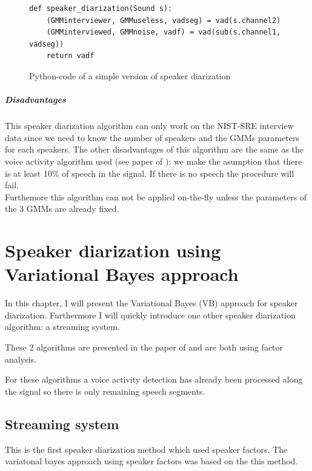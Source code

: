 \documentclass{techrep} %
\begin{document}
\begin{figure}[H]
  \begin{lstlisting}[frame=single]
    def speaker_diarization(Sound s):
    (GMMinterviewer, GMMuseless, vadseg) = vad(s.channel2)
    (GMMinterviewed, GMMnoise, vadf) = vad(sub(s.channel1, vadseg))
    return vadf
  \end{lstlisting}
  \caption{Python-code of a simple version of speaker diarization}
  \label{pseudocodenaive}
\end{figure}

\paragraph{Disadvantages}

This speaker diarization algorithm can only work on the NIST-SRE
interview data since we need to know the number of speakers and the
GMMs parameters for each speakers. The other disadvantages of this
algorithm are the same as the voice activity algorithm used (see paper
of \cite{CRIM}): we make the asumption that there is at least 10\% of
speech in the signal. If there is no speech the procedure will
fail.\\ Furthemore this algorithm can not be applied on-the-fly unless
the parameters of the 3 GMMs are already fixed.\\

\chapter{Speaker diarization using Variational Bayes approach}

In this chapter, I will present the Variational Bayes (VB) approach for
speaker diarization. Furthermore I will quickly introduce one other
speaker diarization algorithm: a streaming system.

These 2 algorithms are presented in the paper of \cite{DIAFACT} and
are both using factor analysis.

For these algorithms a voice activity detection has already been
processed along the signal so there is only remaining speech segments.

\section{Streaming system}

This is the first speaker diarization method which used speaker
factors. The variatonal bayes approach using speaker factors was based
on the this method.
\end{document}
